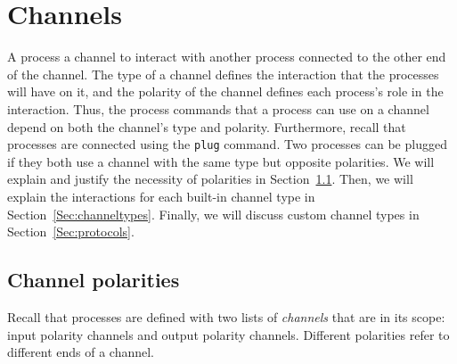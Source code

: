 \documentclass[11pt]{article}
\begin{document}




\section{Channels}
\label{Sec:Channels}

A process  a channel to interact with another process connected to the other end of the channel.
The type of a channel defines the interaction that the processes will have on it, and the polarity of the channel defines each process's role in the interaction. 
Thus, the process commands that a process can use on a channel depend on both the channel's type and polarity. 
Furthermore, recall that processes are connected using the \lstinline$plug$ command.
Two processes can be plugged if they both use a channel with the same type but opposite polarities. 
We will explain and justify the necessity of polarities in Section~\ref{Sec:polarities}.
Then, we will explain the interactions for each built-in channel type in Section~\ref{Sec:channeltypes}.
Finally, we will discuss custom channel types in Section~\ref{Sec:protocols}.


\subsection{Channel polarities}
\label{Sec:polarities}

Recall that processes are defined with two lists of {\em channels} that are in its scope: input polarity channels and output polarity 
channels. Different polarities refer to different ends of a channel. 
\end{document}
